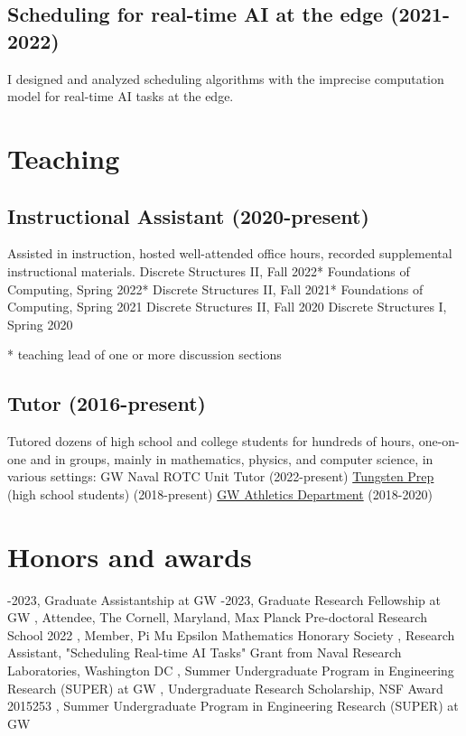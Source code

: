 \documentclass[letterpaper]{article}
\begin{document}
\subsection*{Scheduling for real-time AI at the edge (2021-2022)}
I designed and analyzed scheduling algorithms with the imprecise computation model for real-time AI tasks at the edge. 

\section*{Teaching}
\subsection*{Instructional Assistant (2020-present)}
Assisted in instruction, hosted well-attended office hours, recorded supplemental instructional materials.
\subitem
Discrete Structures II, Fall 2022*
\subitem
Foundations of Computing, Spring 2022*
\subitem
Discrete Structures II, Fall 2021*
\subitem
Foundations of Computing, Spring 2021
\subitem
Discrete Structures II, Fall 2020
\subitem
Discrete Structures I, Spring 2020

* teaching lead of one or more discussion sections

\subsection*{Tutor (2016-present)}
Tutored dozens of high school and college students for hundreds of hours, one-on-one and in groups, mainly in mathematics, physics, and computer science, in various settings:
\subitem 
GW Naval ROTC Unit Tutor (2022-present)
\subitem
\href{https://www.tungstenprep.com/}{Tungsten Prep} (high school students) (2018-present) 
\subitem
\href{https://gwsports.com/sports/2018/7/23/school-bio-academic-support-tutor-info-html.aspx}{GW Athletics Department} (2018-2020) 

\section*{Honors and awards}

-2023, Graduate Assistantship at GW
-2023, Graduate Research Fellowship at GW
, Attendee, The Cornell, Maryland, Max Planck Pre-doctoral Research School 2022
, Member, Pi Mu Epsilon Mathematics Honorary Society
, Research Assistant, "Scheduling Real-time AI Tasks" Grant from Naval Research Laboratories, Washington DC
, Summer Undergraduate Program in Engineering Research (SUPER) at GW
, Undergraduate Research Scholarship, NSF Award 2015253
, Summer Undergraduate Program in Engineering Research (SUPER) at GW
\end{document}
